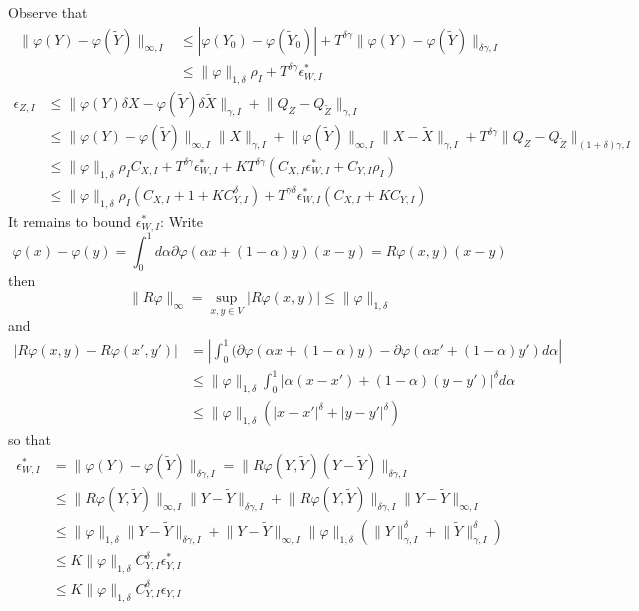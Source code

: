 \documentclass[a4paper,12pt,reqno]{amsproc}
\newcommand{\der}{\delta\!}
\newcommand{\norm}[1]{\lVert #1\rVert}
\newcommand{\wt}{\widetilde}
\begin{document}
Observe that
\begin{equation*}
  \begin{split}
\norm{\varphi(Y)-\varphi(\wt Y)}_{\infty,I} &\le
|\varphi(Y_0)-\varphi(\wt Y_0)| + T^{\delta\gamma}
\norm{\varphi(Y)-\varphi(\wt Y)}_{\delta\gamma,I}    
\\ & \le \norm{\varphi}_{1,\delta}\rho_I + T^{\delta\gamma} \epsilon^*_{W,I}
  \end{split}
\end{equation*}
\begin{equation*}
  \begin{split}
  \epsilon_{Z,I} & \le \norm{\varphi(Y) \der X-\varphi(\wt Y) \der \wt
    X}_{\gamma,I} + \norm{Q_Z-Q_{\wt Z}}_{\gamma,I}
\\ & \le \norm{\varphi(Y)-\varphi(\wt Y)}_{\infty,I}
  \norm{X}_{\gamma,I} + \norm{\varphi(\wt Y)}_{\infty,I} \norm{X-\wt
  X}_{\gamma,I} + T^{\delta\gamma} \norm{Q_Z-Q_{\wt
    Z}}_{(1+\delta)\gamma,I}    
\\ & \le \norm{\varphi}_{1,\delta} \rho_I C_{X,I}+T^{\delta\gamma}
    \epsilon^*_{W,I}+ K T^{\delta\gamma} (C_{X,I}
  \epsilon^*_{W,I} + C_{Y,I} \rho_I)
\\ & \le \norm{\varphi}_{1,\delta} \rho_I (C_{X,I}+1+KC_{Y,I}^\delta)
    + T^{\gamma\delta} \epsilon_{W,I}^* (C_{X,I}+KC_{Y,I})
  \end{split}
\end{equation*}
It remains to bound $\epsilon_{W,I}^*$:
Write
$$
\varphi(x)-\varphi(y) = \int_0^1 d\alpha \partial\varphi(\alpha x +
(1-\alpha)y) (x-y) = R\varphi(x,y)(x-y) 
$$
then
$$
\norm{R\varphi}_{\infty} = \sup_{x,y \in V} |R\varphi(x,y)| \le \norm{\varphi}_{1,\delta}
$$
and
\begin{equation*}
  \begin{split}
|R\varphi(x,y)-R\varphi(x',y')| & = \left|\int_0^1 (\partial \varphi(\alpha x +
(1-\alpha)y)-\partial \varphi(\alpha x' +
(1-\alpha)y') d\alpha \right|
    \\ & \le \norm{\varphi}_{1,\delta}
\int_0^1 |\alpha (x-x') +
(1-\alpha)(y-y')|^\delta d\alpha 
    \\ & \le \norm{\varphi}_{1,\delta}(|x-x'|^\delta+|y-y'|^\delta)
  \end{split}
\end{equation*}
so that
\begin{equation*}
  \begin{split}
    \epsilon^*_{W,I}  & = \norm{\varphi(Y)-\varphi(\wt
  Y)}_{\delta\gamma,I} 
=     \norm{R\varphi(Y,\wt Y)(Y-\wt Y)}_{\delta\gamma,I}
\\ & \le \norm{R\varphi(Y,\wt Y)}_{\infty,I} \norm{Y-\wt
  Y}_{\delta\gamma,I} + \norm{R\varphi(Y,\wt
  Y)}_{\delta\gamma,I}\norm{Y-\wt Y}_{\infty,I}
\\ & \le \norm{\varphi}_{1,\delta} \norm{Y-\wt
  Y}_{\delta\gamma,I} + \norm{Y-\wt Y}_{\infty,I}
  \norm{\varphi}_{1,\delta} (\norm{Y}^\delta_{\gamma,I} + \norm{\wt
  Y}^\delta_{\gamma,I})
\\ & \le K \norm{\varphi}_{1,\delta} C_{Y,I}^\delta \epsilon_{Y,I}^*
\\ & \le K \norm{\varphi}_{1,\delta} C_{Y,I}^\delta \epsilon_{Y,I}
  \end{split}
\end{equation*}
\end{document}
